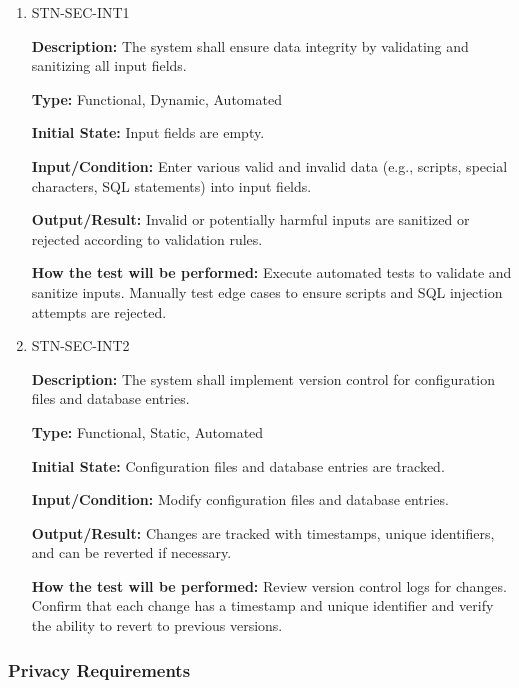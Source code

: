 \documentclass[12pt, titlepage]{article}
\begin{document}
\begin{enumerate}

\item{STN-SEC-INT1\\}

\textbf{Description:} The system shall ensure data integrity by validating and sanitizing all input fields.

\textbf{Type:} Functional, Dynamic, Automated

\textbf{Initial State:} Input fields are empty.

\textbf{Input/Condition:} Enter various valid and invalid data (e.g., scripts, special characters, SQL statements) into input fields.

\textbf{Output/Result:} Invalid or potentially harmful inputs are sanitized or rejected according to validation rules.

\textbf{How the test will be performed:} Execute automated tests to validate and sanitize inputs. Manually test edge cases to ensure scripts and SQL injection attempts are rejected.

\item{STN-SEC-INT2\\}

\textbf{Description:} The system shall implement version control for configuration files and database entries.

\textbf{Type:} Functional, Static, Automated

\textbf{Initial State:} Configuration files and database entries are tracked.

\textbf{Input/Condition:} Modify configuration files and database entries.

\textbf{Output/Result:} Changes are tracked with timestamps, unique identifiers, and can be reverted if necessary.

\textbf{How the test will be performed:} Review version control logs for changes. Confirm that each change has a timestamp and unique identifier and verify the ability to revert to previous versions.

\end{enumerate}

\subsubsection{Privacy Requirements}
\end{document}
